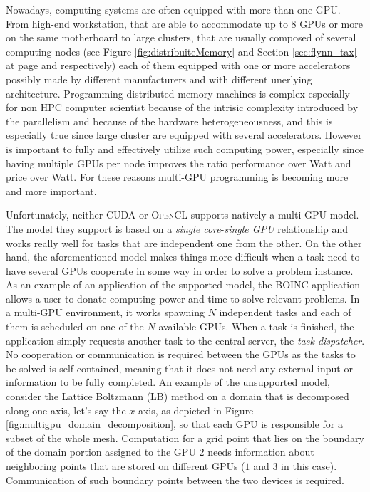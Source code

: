 Nowadays, computing systems are often equipped with more than one GPU.
From high-end workstation, that are able to accommodate up to 8 GPUs or more on the same motherboard to large clusters, that are usually composed of several computing nodes (see Figure \ref{fig:distribuiteMemory} and Section \ref{sec:flynn_tax} at page \pageref{fig:distribuiteMemory} and \pageref{sec:flynn_tax} respectively) each of them equipped with one or more accelerators possibly made by different manufacturers and with different unerlying architecture.
Programming distributed memory machines is complex especially for non HPC computer scientist because of the intrisic complexity introduced by the parallelism and because of the hardware heterogeneousness, and this is especially true since large cluster are equipped with several accelerators.
However is important to fully and effectively utilize such computing power, especially since having multiple GPUs per node improves the ratio performance over Watt and  price over Watt.
For these reasons multi-GPU programming is becoming more and more important.

Unfortunately, neither \textsc{CUDA} or \textsc{OpenCL} supports natively a multi-GPU model.
The model they support is based on a \textit{single core}-\textit{single GPU} relationship and works really well for tasks that are independent one from the other.
On the other hand, the aforementioned model makes things  more difficult when a task need to have several GPUs cooperate in some way in order to solve a problem instance.
As an example of an application of the supported model, the \textsc{BOINC} application \cite{anderson:2004} allows a user to donate computing power and time to solve relevant problems.
In a multi-GPU environment, it works spawning $N$ independent tasks and each of them is scheduled on one of the $N$ available GPUs.
When a task is finished, the application simply requests another task to the central server, the \textit{task dispatcher}.
No cooperation or communication is required between the GPUs as the tasks to be solved is self-contained, meaning that it does not need any external input or information to be fully completed.
An example of the unsupported model, consider the Lattice Boltzmann (LB) \cite{McNamara&Zanetti-1988} \cite{Aidun2010439} \cite{Higuera&Jimenez-1989} method on a domain that is decomposed along one axis, let's say the $x$ axis, as depicted in Figure \ref{fig:multigpu_domain_decomposition}, so that each GPU is responsible for a subset of the whole mesh.
Computation for a grid point that lies on the boundary of the domain portion assigned to the GPU $2$ needs information about neighboring points that are stored on different GPUs ($1$ and $3$ in this case).
Communication of such boundary points between the two devices is required.

